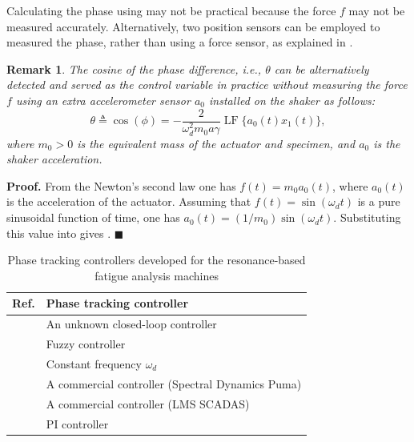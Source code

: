 \documentclass[lettersize,journal]{IEEEtran}
\DeclareMathOperator{\LF}{LF}
\newtheorem{remark}{Remark}
\begin{document}
 Calculating the phase using  may not be practical because the force $f$ may not be measured accurately. Alternatively, two position sensors can be employed to measured the phase, rather than using a force sensor, as explained in .
\begin{remark} \label{R_practical_phase_detection}
The cosine of the phase difference, {\em i.e.}, $\theta$ can be alternatively detected and served as the control variable in practice without measuring the force $f$ using an extra accelerometer sensor $a_0$ installed on the shaker as follows:
\begin{equation}
\theta\triangleq \cos(\phi) = -\frac{2} {\omega_d^2 m_0a\gamma}\LF \{a_0(t) x_1(t) \} ,
\label{E_phase_measured}
\end{equation}
where $m_0>0$ is the equivalent mass of the actuator and specimen, and $a_0$ is the shaker acceleration.
\end{remark} 
\noindent \textbf{Proof.}
From the Newton's second law one has $f(t)=m_0 a_0(t)$, where $a_0(t)$ is the acceleration of the actuator. Assuming that $f(t)=\sin(\omega_d t)$ is a pure sinusoidal function of time, one has $a_0(t)=(1/m_0)\sin(\omega_d t)$. Substituting this value into  gives .
$\blacksquare$


\begin{table}
    \centering
    \begin{tabular}{|l|l|} \hline
     Ref.    &  Phase tracking controller  \\ \hline
    \cite{George_2006}  &  An unknown closed-loop controller \\  \hline
      \cite{Ji_2010}   &  Fuzzy controller  \\ \hline
    \cite{SCHRAMM2024117045,SCHNEIDER2018171,herrmann2018simulation_Thesis}  &  Constant frequency $\omega_d$ \\ \hline
    \cite{Su2014} & A commercial controller (Spectral Dynamics Puma) \\ \hline
    \cite{Dupke2026} & A commercial controller (LMS SCADAS) \\ \hline
    \cite{DORANGA2024115368} & PI controller \\
    \hline
    \end{tabular}
    \vspace{0.1cm}
    \caption{Phase tracking controllers developed for the resonance-based fatigue analysis machines}
    \label{T_frequency_seeking}
\end{table}
\end{document}
